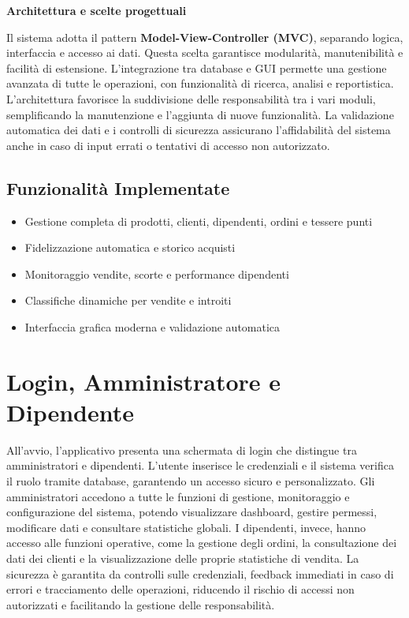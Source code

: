 \documentclass[a4paper,12pt]{article}
\begin{document}
\noindent\textbf{Architettura e scelte progettuali}

Il sistema adotta il pattern \textbf{Model-View-Controller (MVC)}, separando logica, interfaccia e accesso ai dati. Questa scelta garantisce modularità, manutenibilità e facilità di estensione. L'integrazione tra database e GUI permette una gestione avanzata di tutte le operazioni, con funzionalità di ricerca, analisi e reportistica. L'architettura favorisce la suddivisione delle responsabilità tra i vari moduli, semplificando la manutenzione e l'aggiunta di nuove funzionalità. La validazione automatica dei dati e i controlli di sicurezza assicurano l'affidabilità del sistema anche in caso di input errati o tentativi di accesso non autorizzato.

\subsection*{Funzionalità Implementate}
\begin{keybox}
\begin{itemize}
    \item Gestione completa di prodotti, clienti, dipendenti, ordini e tessere punti
    \item Fidelizzazione automatica e storico acquisti
    \item Monitoraggio vendite, scorte e performance dipendenti
    \item Classifiche dinamiche per vendite e introiti
    \item Interfaccia grafica moderna e validazione automatica
\end{itemize}
\end{keybox}

\section{Login, Amministratore e Dipendente}
All'avvio, l'applicativo presenta una schermata di login che distingue tra amministratori e dipendenti. L'utente inserisce le credenziali e il sistema verifica il ruolo tramite database, garantendo un accesso sicuro e personalizzato. Gli amministratori accedono a tutte le funzioni di gestione, monitoraggio e configurazione del sistema, potendo visualizzare dashboard, gestire permessi, modificare dati e consultare statistiche globali. I dipendenti, invece, hanno accesso alle funzioni operative, come la gestione degli ordini, la consultazione dei dati dei clienti e la visualizzazione delle proprie statistiche di vendita. La sicurezza è garantita da controlli sulle credenziali, feedback immediati in caso di errori e tracciamento delle operazioni, riducendo il rischio di accessi non autorizzati e facilitando la gestione delle responsabilità.
\end{document}
